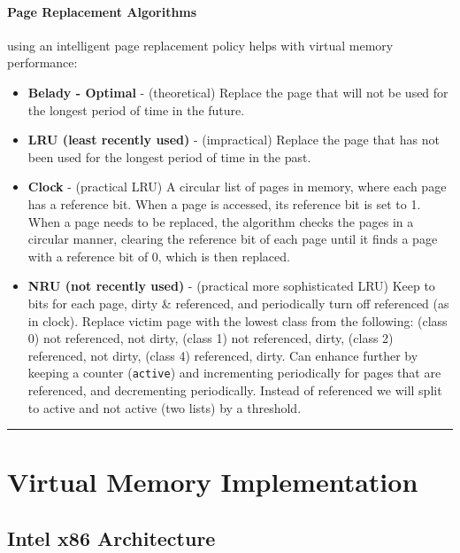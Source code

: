 \documentclass[openany,12pt]{book}
\newcommand{\code}[1]{\texttt{#1}}
\begin{document}
\paragraph{Page Replacement Algorithms} using an intelligent page replacement policy helps with virtual memory performance:
\begin{itemize}
  \item \textbf{Belady - Optimal} - (theoretical) Replace the page that will not be used for the longest period of time in the future. 

  \item \textbf{LRU (least recently used)} - (impractical) Replace the page that has not been used for the longest period of time in the past. 

  \item \textbf{Clock} - (practical LRU) A circular list of pages in memory, where each page has a reference bit. When a page is accessed, its reference bit is set to 1. When a page needs to be replaced, the algorithm checks the pages in a circular manner, clearing the reference bit of each page until it finds a page with a reference bit of 0, which is then replaced.

  \item \textbf{NRU (not recently used)} - (practical more sophisticated LRU) Keep to bits for each page, dirty \& referenced, and periodically turn off referenced (as in clock). Replace victim page with the lowest class from the following: (class 0) not referenced, not dirty, (class 1) not referenced, dirty, (class 2) referenced, not dirty, (class 4) referenced, dirty. Can enhance further by keeping a counter (\code{active}) and incrementing periodically for pages that are referenced, and decrementing periodically. Instead of referenced we will split to active and not active (two lists) by a threshold. 
\end{itemize}





\noindent\rule{\linewidth}{0.4pt}


\section*{Virtual Memory Implementation}

\subsection*{Intel x86 Architecture}
\end{document}
